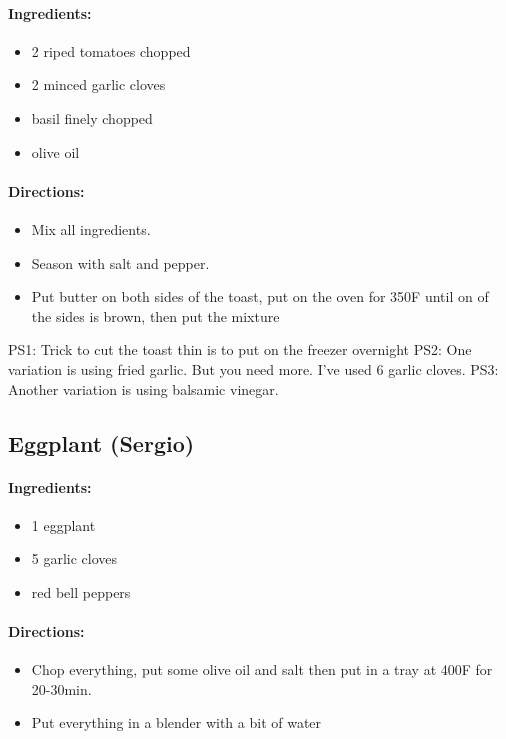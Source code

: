 \documentclass{article}
\begin{document}
\paragraph{Ingredients:}

\begin{itemize}
	\item 2 riped tomatoes chopped
	\item 2 minced garlic cloves
	\item basil finely chopped
	\item olive oil
\end{itemize}

\paragraph{Directions:}
\begin{itemize}
	\item Mix all ingredients.
	\item Season with salt and pepper.
	\item Put butter on both sides of the toast, put on the oven for 350F until on of the sides is brown, then put the mixture
\end{itemize}

PS1: Trick to cut the toast thin is to put on the freezer overnight
PS2: One variation is using fried garlic. But you need more. I've used 6 garlic cloves.
PS3: Another variation is using balsamic vinegar.

\subsection{Eggplant (Sergio)}

\paragraph{Ingredients:}

\begin{itemize}
	\item 1 eggplant
	\item 5 garlic cloves
	\item red bell peppers
\end{itemize}

\paragraph{Directions:}
\begin{itemize}
	\item Chop everything, put some olive oil and salt then put in a tray at 400F for 20-30min.
	\item Put everything in a blender with a bit of water 
\end{itemize}
\end{document}
